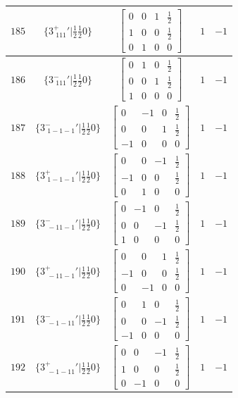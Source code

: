 \documentclass[fleqn,8pt]{jsarticle}
\begin{document}
\begin{longtable}{ccccc}
$ 185 $ & $ \{3^{+}_{\,\,111}{}'|\frac{1}{2} \frac{1}{2} 0\} $ & $ \begin{bmatrix} 0 & 0 & 1 & \frac{1}{2} \\ 1 & 0 & 0 & \frac{1}{2} \\ 0 & 1 & 0 & 0 \end{bmatrix} $ & $ 1 $ & $ -1 $ \\ \hline
$ 186 $ & $ \{3^{-}_{\,\,111}{}'|\frac{1}{2} \frac{1}{2} 0\} $ & $ \begin{bmatrix} 0 & 1 & 0 & \frac{1}{2} \\ 0 & 0 & 1 & \frac{1}{2} \\ 1 & 0 & 0 & 0 \end{bmatrix} $ & $ 1 $ & $ -1 $ \\ \hline
$ 187 $ & $ \{3^{-}_{\,\,1-1-1}{}'|\frac{1}{2} \frac{1}{2} 0\} $ & $ \begin{bmatrix} 0 & -1 & 0 & \frac{1}{2} \\ 0 & 0 & 1 & \frac{1}{2} \\ -1 & 0 & 0 & 0 \end{bmatrix} $ & $ 1 $ & $ -1 $ \\ \hline
$ 188 $ & $ \{3^{+}_{\,\,1-1-1}{}'|\frac{1}{2} \frac{1}{2} 0\} $ & $ \begin{bmatrix} 0 & 0 & -1 & \frac{1}{2} \\ -1 & 0 & 0 & \frac{1}{2} \\ 0 & 1 & 0 & 0 \end{bmatrix} $ & $ 1 $ & $ -1 $ \\ \hline
$ 189 $ & $ \{3^{-}_{\,\,-11-1}{}'|\frac{1}{2} \frac{1}{2} 0\} $ & $ \begin{bmatrix} 0 & -1 & 0 & \frac{1}{2} \\ 0 & 0 & -1 & \frac{1}{2} \\ 1 & 0 & 0 & 0 \end{bmatrix} $ & $ 1 $ & $ -1 $ \\ \hline
$ 190 $ & $ \{3^{+}_{\,\,-11-1}{}'|\frac{1}{2} \frac{1}{2} 0\} $ & $ \begin{bmatrix} 0 & 0 & 1 & \frac{1}{2} \\ -1 & 0 & 0 & \frac{1}{2} \\ 0 & -1 & 0 & 0 \end{bmatrix} $ & $ 1 $ & $ -1 $ \\ \hline
$ 191 $ & $ \{3^{-}_{\,\,-1-11}{}'|\frac{1}{2} \frac{1}{2} 0\} $ & $ \begin{bmatrix} 0 & 1 & 0 & \frac{1}{2} \\ 0 & 0 & -1 & \frac{1}{2} \\ -1 & 0 & 0 & 0 \end{bmatrix} $ & $ 1 $ & $ -1 $ \\ \hline
$ 192 $ & $ \{3^{+}_{\,\,-1-11}{}'|\frac{1}{2} \frac{1}{2} 0\} $ & $ \begin{bmatrix} 0 & 0 & -1 & \frac{1}{2} \\ 1 & 0 & 0 & \frac{1}{2} \\ 0 & -1 & 0 & 0 \end{bmatrix} $ & $ 1 $ & $ -1 $ \\
\end{longtable}
\end{document}
